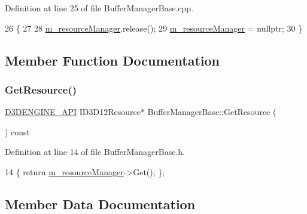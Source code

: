 Definition at line 25 of file Buffer\+Manager\+Base.\+cpp.


\begin{DoxyCode}
26 \{
27 
28     \mbox{\hyperlink{class_buffer_manager_base_a1477064838478bbbf233da29598a2352}{m\_resourceManager}}.release();
29     \mbox{\hyperlink{class_buffer_manager_base_a1477064838478bbbf233da29598a2352}{m\_resourceManager}} = \textcolor{keyword}{nullptr};
30 \}
\end{DoxyCode}


\subsection{Member Function Documentation}
\mbox{\label{class_buffer_manager_base_afa03f652ef76e70618f7f112b7da48c5}} 
\subsubsection{\texorpdfstring{Get\+Resource()}{GetResource()}}
{\footnotesize\ttfamily \mbox{\hyperlink{stdafx_8h_a8ee2d990c5dfba7794dd2b60741d7722}{D3\+D\+E\+N\+G\+I\+N\+E\+\_\+\+A\+PI}} I\+D3\+D12\+Resource$\ast$ Buffer\+Manager\+Base\+::\+Get\+Resource (\begin{DoxyParamCaption}{ }\end{DoxyParamCaption}) const\hspace{0.3cm}{\ttfamily [inline]}}



Definition at line 14 of file Buffer\+Manager\+Base.\+h.


\begin{DoxyCode}
14 \{ \textcolor{keywordflow}{return} \mbox{\hyperlink{class_buffer_manager_base_a1477064838478bbbf233da29598a2352}{m\_resourceManager}}->Get(); \};
\end{DoxyCode}


\subsection{Member Data Documentation}
\mbox{\label{class_buffer_manager_base_a1477064838478bbbf233da29598a2352}} 
